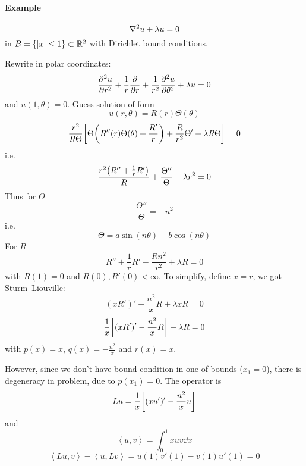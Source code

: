 \paragraph{Example}
$$
\laplacian{u} + \lambda u = 0
$$
in $B =\qty{ \abs{x} \leq 1 } \subset \mathbb{R}^2 $ with Dirichlet bound conditions.

Rewrite in polar coordinates:
$$\pdv[2]{u}{r} + \frac{1}{r} \pdv{r} + \frac{1}{r^2} \pdv[2]{u}{\theta} +\lambda u = 0$$
and $u(1,\theta) = 0$. Guess solution of form
$$u(r,\theta) = R(r)\Theta(\theta)$$
$$\frac{r^2}{R\Theta}\qty[ \Theta \qty(R''(r) \Theta(\theta) + \frac{R'}{r})+ \frac{R}{r^2}\Theta' + \lambda R\Theta ] = 0$$
i.e.
$$\frac{r^2 \qty(R''+\frac{1}{r}R')}{R} + \frac{\Theta''}{\Theta} + \lambda r^2 = 0$$
Thus for $\Theta$
$$\frac{\Theta''}{\Theta} = -n^2$$
i.e.
$$\Theta = a\sin(n\theta) + b\cos(n\theta)$$
For $R$
$$R'' + \frac{1}{r} R' - \frac{Rn^2}{r^2} + \lambda R = 0$$
with $R(1)=0$ and $R(0),R'(0) < \infty$.
To simplify, define $x=r$, we got Sturm–Liouville:
$$(xR')' - \frac{n^2}{x}R + \lambda xR = 0$$
$$\frac{1}{x}\qty[(xR')' - \frac{n^2}{x}R] + \lambda R = 0$$
with $p(x) = x$, $q(x) = -\frac{n^2}{x}$ and $r(x) = x$.

However, since we don't have bound condition in one of bounds ($x_1=0$), there is degeneracy in problem, due to $p(x_1)=0$. The operator is
$$Lu = \frac{1}{x} \qty[(xu')'-\frac{n^2}{x}u]$$
and
$$\left\langle u,v \right\rangle = \int_0^1 xuv \dd{x}$$
$$\left\langle Lu,v \right\rangle - \left\langle u,Lv \right\rangle = u(1)v'(1) - v(1) u'(1) = 0$$
